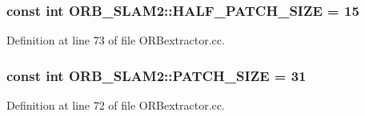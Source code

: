 \subsubsection[{\texorpdfstring{H\+A\+L\+F\+\_\+\+P\+A\+T\+C\+H\+\_\+\+S\+I\+ZE}{HALF_PATCH_SIZE}}]{\setlength{\rightskip}{0pt plus 5cm}const int O\+R\+B\+\_\+\+S\+L\+A\+M2\+::\+H\+A\+L\+F\+\_\+\+P\+A\+T\+C\+H\+\_\+\+S\+I\+ZE = 15}\hypertarget{namespaceORB__SLAM2_aa09849ae679bf2392b097abd710d8d7f}{}\label{namespaceORB__SLAM2_aa09849ae679bf2392b097abd710d8d7f}


Definition at line 73 of file O\+R\+Bextractor.\+cc.

\subsubsection[{\texorpdfstring{P\+A\+T\+C\+H\+\_\+\+S\+I\+ZE}{PATCH_SIZE}}]{\setlength{\rightskip}{0pt plus 5cm}const int O\+R\+B\+\_\+\+S\+L\+A\+M2\+::\+P\+A\+T\+C\+H\+\_\+\+S\+I\+ZE = 31}\hypertarget{namespaceORB__SLAM2_a557e5c298c5f7164667f083494c2197a}{}\label{namespaceORB__SLAM2_a557e5c298c5f7164667f083494c2197a}


Definition at line 72 of file O\+R\+Bextractor.\+cc.

